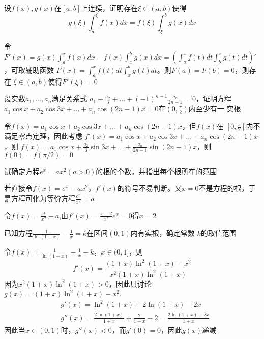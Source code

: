 \documentclass{article}
\begin{document}
\begin{examplle}[]
设\(f(x),g(x)\)在\([a,b]\)上连续，证明存在\(\xi\in(a,b)\)使得
\begin{equation*}
g(\xi)\int_a^\xi f(x)dx=f(\xi)\int_\xi^bg(x)dx
\end{equation*}

令\(F'(x)=g(x)\int_a^x
  f(x)dx-f(x)\int_x^bg(x)dx=(\int^x_af(t)dt\int_b^xg(t)dt)'\)，可取辅助函数
\(F(x)=\int_a^xf(t)dt\int_x^bg(t)dt\)。则\(F(a)=F(b)=0\)，则存在
\(\xi\in(a,b)\)使得\(F'(\xi)=0\)
\end{examplle}

\begin{examplle}[]
设实数\(a_1,\dots,a_n\)满足关系式
\(a_1-\frac{a_2}{3}+\dots+(-1)^{n-1}\frac{a_n}{2n-1}=0\)，证明方程
\(a_1\cos x+a_2\cos 3x+\dots+a_n\cos(2n-1)x=0\)在\((0,\frac{\pi}{2})\)内至少有一
实根

令\(f(x)=a_1\cos x+a_2\cos 3x+\dots+a_n\cos(2n-1)x\)，但\(f(x)\)在
\([0,\frac{\pi}{2}]\)内不满足零点定理，因此考虑
\(f'(x)=a_1\cos x+a_2\cos 3x+\dots+a_n\cos(2n-1)x\)，则
\(f(x)=a_1\cos x+\frac{a_2}{3}\sin 3x+\dots+\frac{a_n}{2n-1}\sin(2n-1)x\)，则
\(f(0)=f(\pi/2)=0\)
\end{examplle}

\begin{examplle}[]
试确定方程\(e^x=ax^2(a>0)\)的根的个数，并指出每个根所在的范围

若直接令\(f(x)=e^x-ax^2\)，\(f'(x)\)的符号不易判断。又\(x=0\)不是方程的根，于
是方程可化为等价方程\(\frac{e^x}{x^2}=a\)

令\(f(x)=\frac{e^x}{x^2}-a\),由\(f'(x)=\frac{x-2}{x^3}e^x=0\)得\(x=2\)
\end{examplle}

\begin{examplle}[]
已知方程\(\frac{1}{\ln(1+x)}-\frac{1}{x}=k\)在区间\((0,1)\)内有实根，确定常数
\(k\)的取值范围

令\(f(x)=\frac{1}{\ln(1+x)}-\frac{1}{x}-k\)，\(x\in(0,1]\)，则
\begin{equation*}
f'(x)=\frac{(1+x)\ln^2(1+x)-x^2}{x^2(1+x)\ln^2(1+x)}
\end{equation*}
因为\(x^2(1+x)\ln^2(1+x)>0\)，因此只讨论\(g(x)=(1+x)\ln^2(1+x)-x^2\).
\begin{align*}
&g'(x)=\ln^2(1+x)+2\ln(1+x)-2x\\
&g''(x)=\frac{2\ln(1+x)}{1+x}+\frac{2}{1+x}-2=\frac{2\ln(1+x)-2x}{1+x}
\end{align*}
因此当\(x\in(0,1)\)时，\(g''(x)<0\)，而\(g'(0)=0\)，因此\(g(x)\)递减
\end{examplle}
\end{document}
